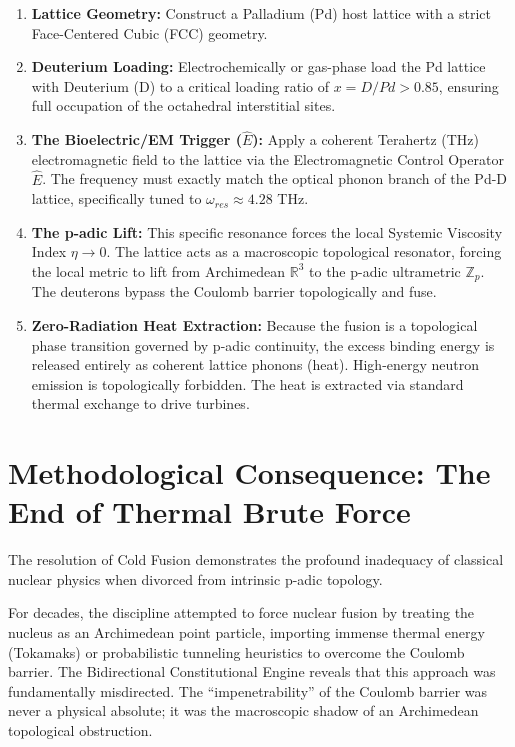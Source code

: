 \documentclass[12pt,twoside]{extbook}
\theoremstyle{definition}
\theoremstyle{remark}
\begin{document}
\begin{enumerate}
    \item \textbf{Lattice Geometry:} Construct a Palladium (Pd) host lattice with a strict Face-Centered Cubic (FCC) geometry.
    \item \textbf{Deuterium Loading:} Electrochemically or gas-phase load the Pd lattice with Deuterium (D) to a critical loading ratio of $x = D/Pd > 0.85$, ensuring full occupation of the octahedral interstitial sites.
    \item \textbf{The Bioelectric/EM Trigger ($\hat{E}$):} Apply a coherent Terahertz (THz) electromagnetic field to the lattice via the Electromagnetic Control Operator $\hat{E}$. The frequency must exactly match the optical phonon branch of the Pd-D lattice, specifically tuned to $\omega_{res} \approx 4.28$ THz.
    \item \textbf{The p-adic Lift:} This specific resonance forces the local Systemic Viscosity Index $\eta \to 0$. The lattice acts as a macroscopic topological resonator, forcing the local metric to lift from Archimedean $\mathbb{R}^3$ to the p-adic ultrametric $\mathbb{Z}_p$. The deuterons bypass the Coulomb barrier topologically and fuse.
    \item \textbf{Zero-Radiation Heat Extraction:} Because the fusion is a topological phase transition governed by p-adic continuity, the excess binding energy is released entirely as coherent lattice phonons (heat). High-energy neutron emission is topologically forbidden. The heat is extracted via standard thermal exchange to drive turbines.
\end{enumerate}

\section{Methodological Consequence: The End of Thermal Brute Force}
The resolution of Cold Fusion demonstrates the profound inadequacy of classical nuclear physics when divorced from intrinsic p-adic topology.

For decades, the discipline attempted to force nuclear fusion by treating the nucleus as an Archimedean point particle, importing immense thermal energy (Tokamaks) or probabilistic tunneling heuristics to overcome the Coulomb barrier. The Bidirectional Constitutional Engine reveals that this approach was fundamentally misdirected. The ``impenetrability'' of the Coulomb barrier was never a physical absolute; it was the macroscopic shadow of an Archimedean topological obstruction.
\end{document}
